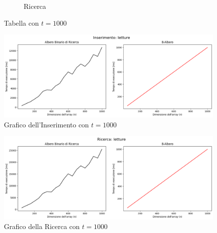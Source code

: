 \begin{figure}[H]
\begin{subfigure}[b]{0.49\textwidth}
        \caption{Ricerca}
        \label{fig:tablesearchtimet1000}
    \end{subfigure}
    \caption{Tabella con $t=1000$}
    \label{fig:tabletimest1000}
\end{figure}

\begin{figure}[H]
    \centering
    \includegraphics[width=\textwidth]{side-graphs/insert-wr-t1000.png}
    \caption{Grafico dell'Inserimento con $t=1000$}
    \label{fig:sidegraphinserttimet1000}
\end{figure}
    
\begin{figure}[H]
    \centering
    \includegraphics[width=\textwidth]{side-graphs/search-wr-t1000.png}
    \caption{Grafico della Ricerca con $t=1000$}
    \label{fig:sidegraphsearchtimet1000}
\end{figure}

